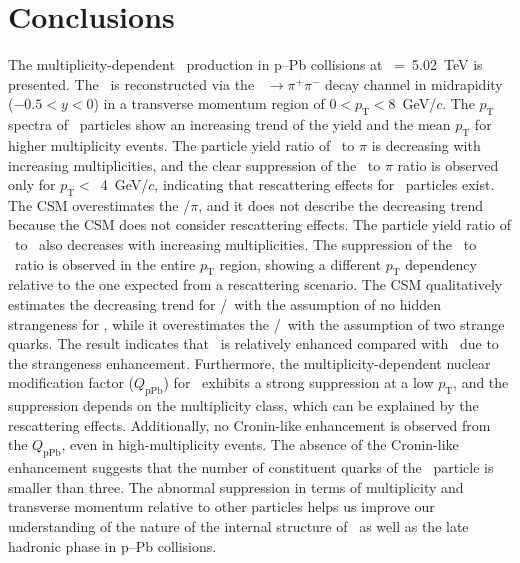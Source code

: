 
\section{Conclusions}
\label{sec:summary}

The multiplicity-dependent \fzero~production in p--Pb collisions at \snn~=~5.02~TeV is presented. The \fzero~is reconstructed via the \fzero~$\rightarrow\pi^{+}\pi^{-}$ decay channel in midrapidity ($-0.5<y<0$) in a transverse momentum region of $0<p_{\mathrm{T}}<8$~GeV/$c$. The $p_{\mathrm{T}}$ spectra of \fzero~particles show an increasing trend of the yield and the mean $p_{\mathrm{T}}$ for higher multiplicity events. The particle yield ratio of \fzero~to $\pi$ is decreasing with increasing multiplicities, and the clear suppression of the \fzero~to $\pi$ ratio is observed only for $p_{\mathrm{T}}<$~4~GeV/$c$, indicating that rescattering effects for \fzero~particles exist. The CSM overestimates the \fzero/$\pi$, and it does not describe the decreasing trend because the CSM does not consider rescattering effects. The particle yield ratio of \fzero~to \kstar~also decreases with increasing multiplicities. The suppression of the \fzero~to \kstar~ratio is observed in the entire $p_{\mathrm{T}}$ region, showing a different $p_{\mathrm{T}}$ dependency relative to the one expected from a rescattering scenario. The CSM qualitatively estimates the decreasing trend for \fzero/\kstar~with the assumption of no hidden strangeness for \fzero, while it overestimates the \fzero/\kstar~with the assumption of two strange quarks. The result indicates that \kstar~is relatively enhanced compared with \fzero~due to the strangeness enhancement. Furthermore, the multiplicity-dependent nuclear modification factor ($Q_{\mathrm{pPb}}$) for \fzero~exhibits a strong suppression at a low $p_{\mathrm{T}}$, and the suppression depends on the multiplicity class, which can be explained by the rescattering effects. Additionally, no Cronin-like enhancement is observed from the $Q_{\mathrm{pPb}}$, even in high-multiplicity events. The absence of the Cronin-like enhancement suggests that the number of constituent quarks of the \fzero~particle is smaller than three. The abnormal suppression in terms of multiplicity and transverse momentum relative to other particles helps us improve our understanding of the nature of the internal structure of \fzero~as well as the late hadronic phase in p–Pb collisions.
